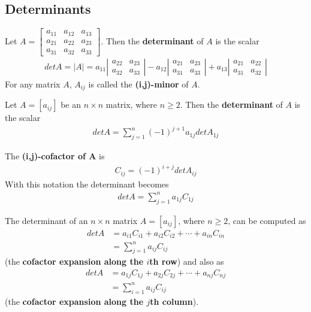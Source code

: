 \documentclass{article}
\begin{document}
\subsection{Determinants}
\begin{definition}
	Let $A=\begin{bmatrix}
			a_{11} & a_{12} & a_{13} \\
			a_{21} & a_{22} & a_{23} \\
			a_{31} & a_{32} & a_{33}
		\end{bmatrix}$.
	Then the \textbf{determinant} of $A$ is the scalar
	\begin{align*}
		det A = |A| = a_{11}\left|\begin{array}{ccc}
			                          a_{22} & a_{23} \\
			                          a_{32} & a_{33}
		                          \end{array}\right| -
		a_{12}\left|\begin{array}{ccc}
			            a_{21} & a_{23} \\
			            a_{31} & a_{33}
		            \end{array}\right| +
		a_{13}\left|\begin{array}{ccc}
			            a_{21} & a_{22} \\
			            a_{31} & a_{32}
		            \end{array}\right|
	\end{align*}
	For any matrix $A$, $A_{ij}$ is called the \textbf{(i,j)-minor} of $A$.
\end{definition}
\begin{definition}
	Let $A=[a_{ij}]$ be an $n\times n$ matrix, where $n\geq 2$. Then the \textbf{determinant} of $A$ is the scalar
	\begin{align*}
		det A = \sum_{j=1}^n (-1)^{j+1}a_{1j}det A_{1j}
	\end{align*}
\end{definition}
\begin{definition}
	The \textbf{(i,j)-cofactor of A} is
	\begin{align*}
		C_{ij}=(-1)^{i+j}det A_{ij}
	\end{align*}
	With this notation the determinant becomes
	\begin{align*}
		det A = \sum^n_{j=1} a_{1j}C_{1j}
	\end{align*}
\end{definition}
\begin{theorem}
	The determinant of an $n\times n$ matrix $A=[a_{ij}]$, where $n\geq 2$, can be computed as
	\begin{align*}
		det A & = a_{i1}C_{i1}+a_{i2}C_{i2} + \cdots + a_{in}C_{in} \\
		      & = \sum_{j=1}^n a_{ij}C_{ij}
	\end{align*}
	(the \textbf{cofactor expansion along the $i$th row}) and also as
	\begin{align*}
		det A & = a_{1j}C_{1j}+a_{2j}C_{2j} + \cdots + a_{nj}C_{nj} \\
		      & = \sum_{i=1}^n a_{ij}C_{ij}
	\end{align*}
	(the \textbf{cofactor expansion along the $j$th column}).
\end{theorem}
\end{document}
